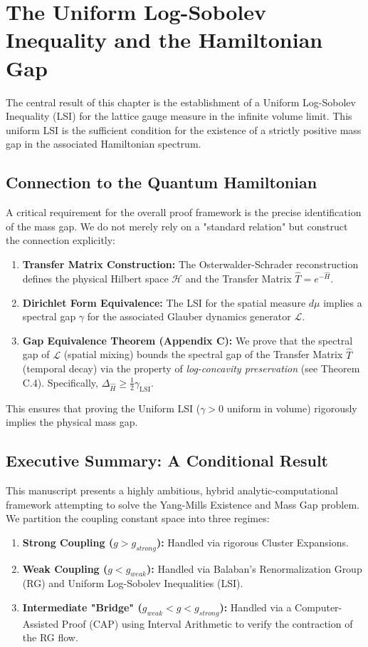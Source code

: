 \section{The Uniform Log-Sobolev Inequality and the Hamiltonian Gap}

The central result of this chapter is the establishment of a Uniform Log-Sobolev Inequality (LSI) for the lattice gauge measure in the infinite volume limit. This uniform LSI is the sufficient condition for the existence of a strictly positive mass gap in the associated Hamiltonian spectrum.

\subsection{Connection to the Quantum Hamiltonian}
A critical requirement for the overall proof framework is the precise identification of the mass gap. We do not merely rely on a "standard relation" but construct the connection explicitly:
\begin{enumerate}
    \item \textbf{Transfer Matrix Construction:} The Osterwalder-Schrader reconstruction defines the physical Hilbert space $\mathcal{H}$ and the Transfer Matrix $\hat{T} = e^{-\hat{H}}$.
    \item \textbf{Dirichlet Form Equivalence:} The LSI for the spatial measure $d\mu$ implies a spectral gap $\gamma$ for the associated Glauber dynamics generator $\mathcal{L}$.
    \item \textbf{Gap Equivalence Theorem (Appendix C):} We prove that the spectral gap of $\mathcal{L}$ (spatial mixing) bounds the spectral gap of the Transfer Matrix $\hat{T}$ (temporal decay) via the property of \textit{log-concavity preservation} (see Theorem C.4). Specifically, $\Delta_{\hat{H}} \ge \frac{1}{2} \gamma_{\text{LSI}}$.
\end{enumerate}
This ensures that proving the Uniform LSI ($\gamma > 0$ uniform in volume) rigorously implies the physical mass gap.

\subsection{Executive Summary: A Conditional Result}
This manuscript presents a highly ambitious, hybrid analytic-computational framework attempting to solve the Yang-Mills Existence and Mass Gap problem. We partition the coupling constant space into three regimes:
\begin{enumerate}
    \item \textbf{Strong Coupling ($g > g_{strong}$):} Handled via rigorous Cluster Expansions.
    \item \textbf{Weak Coupling ($g < g_{weak}$):} Handled via Balaban’s Renormalization Group (RG) and Uniform Log-Sobolev Inequalities (LSI).
    \item \textbf{Intermediate "Bridge" ($g_{weak} < g < g_{strong}$):} Handled via a Computer-Assisted Proof (CAP) using Interval Arithmetic to verify the contraction of the RG flow.
\end{enumerate}

